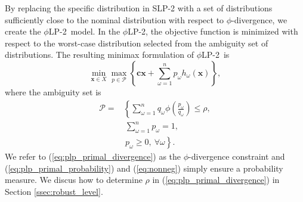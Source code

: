\documentclass[opre,nonblindrev]{informs3} %
\newcommand{\x}{\mathbf{x}}
\renewcommand{\c}{\mathbf{c}}
\newcommand{\plp}{$\phi$LP-2}
\begin{document}
By replacing the specific distribution in SLP-2 with a set of distributions sufficiently close to the nominal distribution with respect to $\phi$-divergence, we create the \plp\ model.
In the \plp, the objective function is minimized with respect to the worst-case distribution selected from the ambiguity set of distributions.
The resulting minimax formulation of \plp\ is
\begin{equation}
	\min_{\x \in X} \max_{p \in \mathcal{P}} \left\{ \c\x + \sum_{\omega=1}^{n} p_\omega h_\omega(\x) \right\}, \label{eq:plp_primal}
\end{equation}
where the ambiguity set is
\begin{align}
	\mathcal{P} = & \left\{ \sum_{\omega = 1}^{n} q_\omega \phi\left(\frac{p_\omega}{q_\omega}\right) \leq \rho, \right. \label{eq:plp_primal_divergence} \\
	& \ \sum_{\omega=1}^{n} p_\omega = 1, \label{eq:plp_primal_probability} \\
	& \ \left. p_\omega \geq 0,\ \forall \omega \right\}. \label{eq:nonneg}
\end{align}
We refer to (\ref{eq:plp_primal_divergence}) as the $\phi$-divergence constraint and (\ref{eq:plp_primal_probability}) and (\ref{eq:nonneg}) simply ensure a probability measure.
We discus how to determine $\rho$ in (\ref{eq:plp_primal_divergence}) in Section \ref{ssec:robust_level}.
\end{document}
